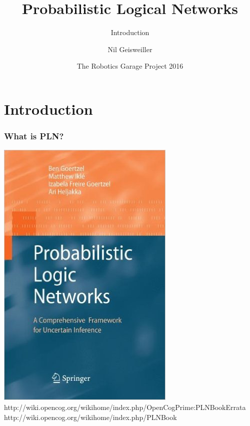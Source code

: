 \documentclass{beamer}
\title{Probabilistic Logical Networks}
\subtitle{Introduction}
\author{Nil Geisweiller}
\institute[OpenCog Foundation] %
{
  OpenCog Foundation
}
\date[The Robotics Garage Project 2016] %
{The Robotics Garage Project 2016}
\begin{document}
\frame
{
  \maketitle
}
\section[Outline]{}
\frame{\tableofcontents}

\section{Introduction}

\frame
{
  \frametitle{What is PLN?}

  \includegraphics[scale=0.3]{PLN.jpg}\\
  {\scriptsize
    {\color{green}http://wiki.opencog.org/wikihome/index.php/OpenCogPrime:PLNBookErrata}\\
    {\color{green}http://wiki.opencog.org/wikihome/index.php/PLNBook}}
}
\end{document}
